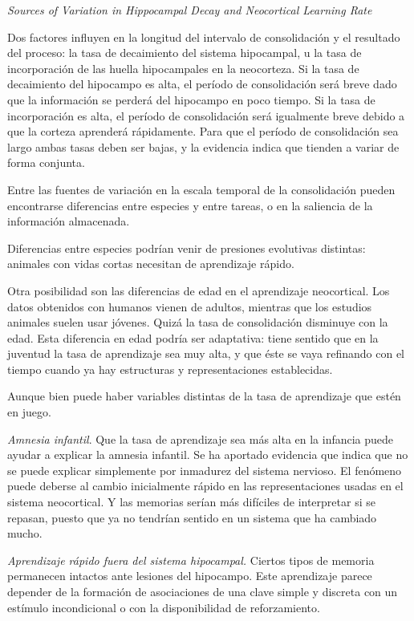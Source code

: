 \documentclass[a4paper,12pt]{article}
\begin{document}
{\itshape Sources of Variation in Hippocampal Decay and Neocortical Learning Rate}

Dos factores influyen en la longitud del intervalo de consolidación y el resultado del proceso: la tasa de decaimiento del sistema hipocampal, u la tasa de incorporación de las huella hipocampales en la neocorteza. Si la tasa de decaimiento del hipocampo es alta, el período de consolidación será breve dado que la información se perderá del hipocampo en poco tiempo. Si la tasa de incorporación es alta, el período de consolidación será igualmente breve debido a que la corteza aprenderá rápidamente. Para que el período de consolidación sea largo ambas tasas deben ser bajas, y la evidencia indica que tienden a variar de forma conjunta.

Entre las fuentes de variación en la escala temporal de la consolidación pueden encontrarse diferencias entre especies y entre tareas, o en la saliencia de la información almacenada.

Diferencias entre especies podrían venir de presiones evolutivas distintas: animales con vidas cortas necesitan de aprendizaje rápido.

Otra posibilidad son las diferencias de edad en el aprendizaje neocortical. Los datos obtenidos con humanos vienen de adultos, mientras que los estudios animales suelen usar jóvenes. Quizá la tasa de consolidación disminuye con la edad. Esta diferencia en edad podría ser adaptativa: tiene sentido que en la juventud la tasa de aprendizaje sea muy alta, y que éste se vaya refinando con el tiempo cuando ya hay estructuras y representaciones establecidas.

Aunque bien puede haber variables distintas de la tasa de aprendizaje que estén en juego.

{\itshape Amnesia infantil}. Que la tasa de aprendizaje sea más alta en la infancia puede ayudar a explicar la amnesia infantil. Se ha aportado evidencia que indica que no se puede explicar simplemente por inmadurez del sistema nervioso. El fenómeno puede deberse al cambio inicialmente rápido en las representaciones usadas en el sistema neocortical. Y las memorias serían más difíciles de interpretar si se repasan, puesto que ya no tendrían sentido en un sistema que ha cambiado mucho.

{\itshape Aprendizaje rápido fuera del sistema hipocampal.} Ciertos tipos de memoria permanecen intactos ante lesiones del hipocampo. Este aprendizaje parece depender de la formación de asociaciones de una clave simple y discreta con un estímulo incondicional o con la disponibilidad de reforzamiento. 
\end{document}
